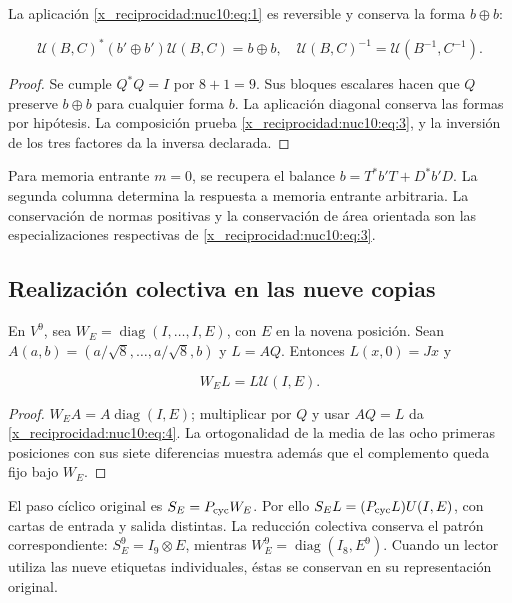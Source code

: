 \begin{theorem}
La aplicación \eqref{x_reciprocidad:nuc10:eq:1} es reversible y conserva la forma \(b\oplus b\):



\begin{equation}
\mathcal U(B,C)^*(b'\oplus b')\mathcal U(B,C)=b\oplus b,
\quad\mathcal U(B,C)^{-1}=\mathcal U(B^{-1},C^{-1}).
\label{x_reciprocidad:nuc10:eq:3}
\end{equation}
\end{theorem}



\begin{proof}
Se cumple \(Q^*Q=I\) por \(8+1=9\). Sus bloques escalares hacen que \(Q\) preserve \(b\oplus b\) para cualquier forma \(b\). La aplicación diagonal conserva las formas por hipótesis. La composición prueba \eqref{x_reciprocidad:nuc10:eq:3}, y la inversión de los tres factores da la inversa declarada.
\end{proof}

Para memoria entrante \(m=0\), se recupera el balance \(b=T^*b'T+D^*b'D\). La segunda columna determina la respuesta a memoria entrante arbitraria. La conservación de normas positivas y la conservación de área orientada son las especializaciones respectivas de \eqref{x_reciprocidad:nuc10:eq:3}.

\subsection{Realización colectiva en las nueve copias}

En \(V^9\), sea \(W_E=\operatorname{diag}(I,\ldots,I,E)\), con \(E\) en la novena posición. Sean \(A(a,b)=(a/\sqrt8,\ldots,a/\sqrt8,b)\) y \(L=AQ\). Entonces \(L(x,0)=Jx\) y



\begin{equation}
W_E L=L\mathcal U(I,E).
\label{x_reciprocidad:nuc10:eq:4}
\end{equation}



\begin{proof}
\(W_EA=A\operatorname{diag}(I,E)\); multiplicar por \(Q\) y usar \(AQ=L\) da \eqref{x_reciprocidad:nuc10:eq:4}. La ortogonalidad de la media de las ocho primeras posiciones con sus siete diferencias muestra además que el complemento queda fijo bajo \(W_E\).
\end{proof}

El paso cíclico original es \(S_E=P_{\rm cyc}W_E\). Por ello \(S_EL=(P_{\rm cyc}L)U(I,E)\), con cartas de entrada y salida distintas. La reducción colectiva conserva el patrón correspondiente: \(S_E^9=I_9\otimes E\), mientras \(W_E^9=\operatorname{diag}(I_8,E^9)\). Cuando un lector utiliza las nueve etiquetas individuales, éstas se conservan en su representación original.

